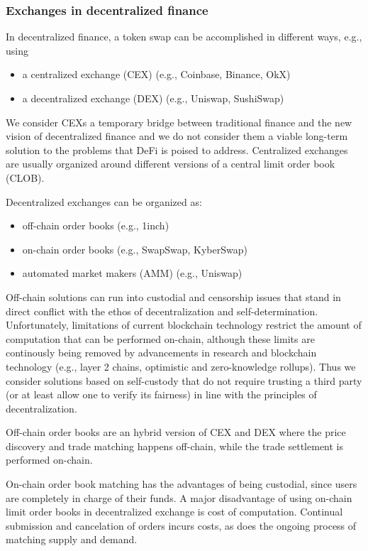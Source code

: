\documentclass[11pt, reqno]{amsart}
\theoremstyle{definition}
\theoremstyle{remark}
\begin{document}
\subsubsection{Exchanges in decentralized finance}
In decentralized finance, a token swap can be accomplished in different ways,
e.g., using
\begin{itemize}
	\item a centralized exchange (CEX) (e.g., Coinbase, Binance, OkX)
	\item a decentralized exchange (DEX) (e.g., Uniswap, SushiSwap)
\end{itemize}

We consider CEXs a temporary bridge between traditional finance and the
new vision of decentralized finance and we do not consider them a viable
long-term solution to the problems that DeFi is poised to address.
Centralized exchanges are usually organized around different versions of a
central limit order book (CLOB).

Decentralized exchanges can be organized as:
\begin{itemize}
	\item off-chain order books (e.g., 1inch)
	\item on-chain order books (e.g., SwapSwap, KyberSwap)
	\item automated market makers (AMM) (e.g., Uniswap)
\end{itemize}

Off-chain solutions can run into custodial and censorship issues that stand
in direct conflict with the ethos of decentralization and self-determination.
Unfortunately, limitations of current blockchain technology restrict
the amount of computation that can be performed on-chain, although these limits
are continously being removed by advancements in research and blockchain
technology (e.g., layer 2 chains, optimistic and zero-knowledge rollups).
Thus we consider solutions based on self-custody that do not require
trusting a third party (or at least allow one to verify its fairness) in line
with the principles of decentralization.

Off-chain order books are an hybrid version of CEX and DEX where the price
discovery and trade matching happens off-chain, while the trade settlement is
performed on-chain.

On-chain order book matching has the advantages of being custodial, since users
are completely in charge of their funds.
A major disadvantage of using on-chain limit order books in decentralized
exchange is cost of computation. Continual submission and cancelation of orders
incurs costs, as does the ongoing process of matching supply and demand.
\end{document}
